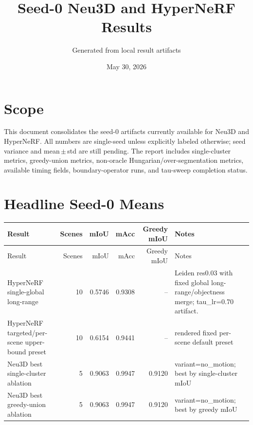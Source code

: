 \documentclass[10pt]{article}
\begin{document}
\title{Seed-0 Neu3D and HyperNeRF Results}
\author{Generated from local result artifacts}
\date{May 30, 2026}
\maketitle

\section{Scope}
This document consolidates the seed-0 artifacts currently available for Neu3D and HyperNeRF. All numbers are single-seed unless explicitly labeled otherwise; seed variance and mean\,$\pm$\,std are still pending. The report includes single-cluster metrics, greedy-union metrics, non-oracle Hungarian/over-segmentation metrics, available timing fields, boundary-operator runs, and tau-sweep completion status.

\section{Headline Seed-0 Means}
\small
\begin{longtable}{lrrrrp{9cm}}
\toprule
Result & Scenes & mIoU & mAcc & Greedy mIoU & Notes \\
\midrule
\endfirsthead
\toprule
Result & Scenes & mIoU & mAcc & Greedy mIoU & Notes \\
\midrule
\endhead
HyperNeRF single-global long-range & 10 & 0.5746 & 0.9308 & -- & Leiden res0.03 with fixed global long-range/objectness merge; tau\_lr=0.70 artifact. \\
HyperNeRF targeted/per-scene upper-bound preset & 10 & 0.6154 & 0.9441 & -- & rendered fixed per-scene default preset \\
Neu3D best single-cluster ablation & 5 & 0.9063 & 0.9947 & 0.9120 & variant=no\_motion; best by single-cluster mIoU \\
Neu3D best greedy-union ablation & 5 & 0.9063 & 0.9947 & 0.9120 & variant=no\_motion; best by greedy mIoU \\
\bottomrule
\end{longtable}
\normalsize
\end{document}
